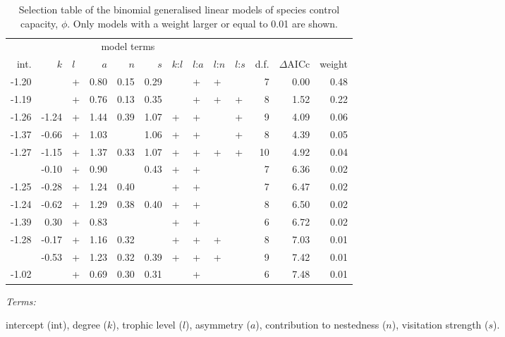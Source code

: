 \documentclass[a4paper]{artikel1}
\theoremstyle{definition}
\theoremstyle{definition}
\theoremstyle{definition}
\theoremstyle{remark}
\begin{document}
\begin{table}

\caption{\label{tab:tab-model-selection-table}Selection table of the binomial generalised linear models of species control capacity, $\phi$. Only models with a weight larger or equal to 0.01 are shown.}
\centering
\fontsize{8}{10}\selectfont
\begin{threeparttable}
\begin{tabular}[t]{rrlrrrllllrrr}
\toprule
\multicolumn{10}{c}{model terms} & \multicolumn{ 3}{c}{ } \\
\cmidrule(l{2pt}r{2pt}){1-10}
int. & $k$ & $l$ & $a$ & $n$ & $s$ & $k$:$l$ & $l$:$a$ & $l$:$n$ & $l$:$s$ & d.f. & $\Delta$AICc & weight\\
\midrule
-1.20 &  & + & 0.80 & 0.15 & 0.29 &  & + & + &  & 7 & 0.00 & 0.48\\
-1.19 &  & + & 0.76 & 0.13 & 0.35 &  & + & + & + & 8 & 1.52 & 0.22\\
-1.26 & -1.24 & + & 1.44 & 0.39 & 1.07 & + & + &  & + & 9 & 4.09 & 0.06\\
-1.37 & -0.66 & + & 1.03 &  & 1.06 & + & + &  & + & 8 & 4.39 & 0.05\\
-1.27 & -1.15 & + & 1.37 & 0.33 & 1.07 & + & + & + & + & 10 & 4.92 & 0.04\\
\addlinespace
-1.37 & -0.10 & + & 0.90 &  & 0.43 & + & + &  &  & 7 & 6.36 & 0.02\\
-1.25 & -0.28 & + & 1.24 & 0.40 &  & + & + &  &  & 7 & 6.47 & 0.02\\
-1.24 & -0.62 & + & 1.29 & 0.38 & 0.40 & + & + &  &  & 8 & 6.50 & 0.02\\
-1.39 & 0.30 & + & 0.83 &  &  & + & + &  &  & 6 & 6.72 & 0.02\\
-1.28 & -0.17 & + & 1.16 & 0.32 &  & + & + & + &  & 8 & 7.03 & 0.01\\
\addlinespace
-1.26 & -0.53 & + & 1.23 & 0.32 & 0.39 & + & + & + &  & 9 & 7.42 & 0.01\\
-1.02 &  & + & 0.69 & 0.30 & 0.31 &  & + &  &  & 6 & 7.48 & 0.01\\
\bottomrule
\end{tabular}
\begin{tablenotes}[para]
\item \textit{Terms: } 
\item intercept (int), degree ($k$), trophic level ($l$), asymmetry ($a$), contribution to nestedness ($n$), visitation strength ($s$).
\end{tablenotes}
\end{threeparttable}
\end{table}
\end{document}
